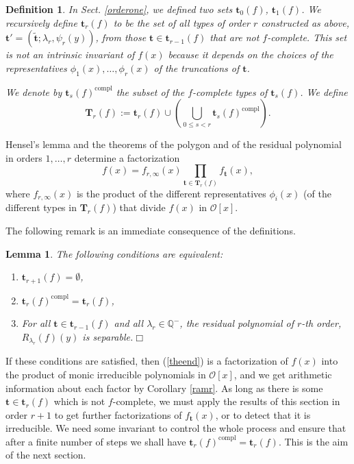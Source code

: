 \documentclass{amsart}
\newtheorem{lemma}[theorem]{Lemma}
\newtheorem{definition}[theorem]{Definition}
\newcommand{\Q}{\mathbb Q}
\def\op{\operatorname}
\def\la{\lambda}
\def\oo{{\mathcal O}}
\def\ty{\mathbf{t}}
\def\Ty{\mathbf{T}}
\def\zpx{\oo[x]}
\begin{document}
\begin{definition}
In Sect. \ref{orderone}, we defined two sets $\ty_0(f)$, $\ty_1(f)$. We recursively define $\ty_r(f)$ to be the set of all types  of order $r$ constructed as above, $\ty'=(\tilde{\ty};\la_r,\psi_r(y))$, from those $\ty\in\ty_{r-1}(f)$ that are not $f$-complete.
This set is not an intrinsic invariant of $f(x)$ because it depends on the choices of the representatives $\phi_1(x),\dots,\phi_r(x)$ of the truncations of $\ty$.

We denote by $\ty_s(f)^{\op{compl}}$ the subset of the $f$-complete types of $\ty_s(f)$. We define
$$
\Ty_r(f):=\ty_r(f)\cup\left(\bigcup_{0\le s<r}\ty_s(f)^{\op{compl}}\right).
$$  
\end{definition}

Hensel's lemma and the theorems of the polygon and of the residual polynomial in orders $1,\dots,r$ determine a factorization   
\begin{equation}\label{theend}
f(x)=f_{r,\infty}(x)\prod_{\ty\in\Ty_r(f)}f_{\ty}(x),
\end{equation}
where $f_{r,\infty}(x)$ is the product of the different representatives $\phi_i(x)$ (of the different types in $\Ty_r(f)$) that divide $f(x)$ in $\zpx$. 

The following remark is an immediate consequence of the definitions.
\begin{lemma}\label{tempty}
The following conditions are equivalent:
\begin{enumerate}
 \item $\ty_{r+1}(f)=\emptyset$,
\item $\ty_r(f)^{\op{compl}}=\ty_r(f)$,
\item For all $\ty\in \ty_{r-1}(f)$ and all $\la_r\in\Q^-$, the residual polynomial of $r$-th order, $R_{\la_r}(f)(y)$ is separable.\hfill{$\Box$}
\end{enumerate}
\end{lemma}

If these conditions are satisfied, then (\ref{theend}) is a factorization of $f(x)$ into the product of monic irreducible polynomials in $\zpx$, and we get arithmetic information about each factor by Corollary \ref{ramr}. As long as there is some $\ty\in\ty_r(f)$ which is not $f$-complete, we must apply the results of this section in order $r+1$ to get further factorizations of $f_\ty(x)$, or to detect that it is irreducible.
We need some invariant to control the whole process and ensure that after a finite number of steps we shall have $\ty_r(f)^{\op{compl}}=\ty_r(f)$. This is the aim of the next section.
\end{document}
